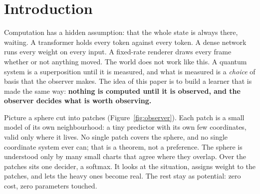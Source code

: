 \section{Introduction}\label{sec:intro}

Computation has a hidden assumption: that the whole state is always there, waiting. A transformer holds every token against every token. A dense network runs every weight on every input. A fixed-rate renderer draws every frame whether or not anything moved. The world does not work like this. A quantum system is a superposition until it is measured, and what is measured is a \emph{choice} of basis that the observer makes. The idea of this paper is to build a learner that is made the same way: \textbf{nothing is computed until it is observed, and the observer decides what is worth observing.}

Picture a sphere cut into patches (Figure~\ref{fig:observer}). Each patch is a small model of its own neighbourhood: a tiny predictor with its own few coordinates, valid only where it lives. No single patch covers the sphere, and no single coordinate system ever can; that is a theorem, not a preference. The sphere is understood only by many small charts that agree where they overlap. Over the patches sits one decider, a softmax. It looks at the situation, assigns weight to the patches, and lets the heavy ones become real. The rest stay as potential: zero cost, zero parameters touched.

